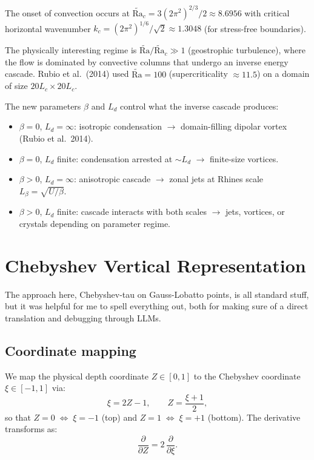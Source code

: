 \documentclass[11pt]{article}
\newcommand{\pderiv}[2]{\frac{\partial #1}{\partial #2}}
\newcommand{\Rav}{\widetilde{\mathrm{Ra}}}
\newcommand{\Ld}{L_d}
\newcommand{\Lc}{L_c}
\begin{document}
The onset of convection occurs at $\Rav_c = 3(2\pi^2)^{2/3}/2 \approx 8.6956$ with critical horizontal wavenumber $k_c = (2\pi^2)^{1/6}/\sqrt{2} \approx 1.3048$ (for stress-free boundaries).

The physically interesting regime is $\Rav/\Rav_c \gg 1$ (geostrophic turbulence), where the flow is dominated by convective columns that undergo an inverse energy cascade. Rubio et al.\ (2014) used $\Rav = 100$ (supercriticality $\approx 11.5$) on a domain of size $20\Lc \times 20\Lc$.

The new parameters $\beta$ and $\Ld$ control what the inverse cascade produces:
\begin{itemize}[nosep]
\item $\beta = 0$, $\Ld = \infty$: isotropic condensation $\to$ domain-filling dipolar vortex (Rubio et al.\ 2014).
\item $\beta = 0$, $\Ld$ finite: condensation arrested at $\sim\Ld$ $\to$ finite-size vortices.
\item $\beta > 0$, $\Ld = \infty$: anisotropic cascade $\to$ zonal jets at Rhines scale $L_\beta = \sqrt{U/\beta}$.
\item $\beta > 0$, $\Ld$ finite: cascade interacts with both scales $\to$ jets, vortices, or crystals depending on parameter regime.
\end{itemize}


\section{Chebyshev Vertical Representation}
\label{sec:vertical}
The approach here, Chebyshev-tau on Gauss-Lobatto points, is all standard stuff, but it was helpful for me to spell everything out, both for making sure of a direct translation and debugging through LLMs.
\subsection{Coordinate mapping}

We map the physical depth coordinate $Z \in [0, 1]$ to the Chebyshev coordinate $\xi \in [-1, 1]$ via:
\begin{equation}
\xi = 2Z - 1, \qquad Z = \frac{\xi + 1}{2},
\label{eq:xi_map}
\end{equation}
so that $Z = 0 \;\Leftrightarrow\; \xi = -1$ (top) and $Z = 1 \;\Leftrightarrow\; \xi = +1$ (bottom). The derivative transforms as:
\begin{equation}
\pderiv{}{Z} = 2\,\pderiv{}{\xi}.
\label{eq:dZ_dxi}
\end{equation}
\end{document}
